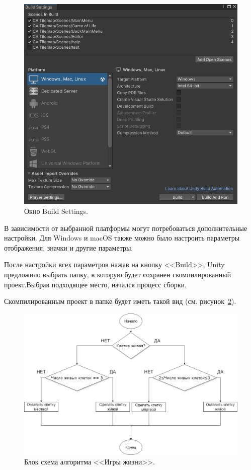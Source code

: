 \begin{figure}[H]
	\centering
	\includegraphics[width=1\textwidth]{images/build2.png}  
	\caption{Окно Build Settings.}
	\label{fig5}
\end{figure}

В зависимости от выбранной платформы могут потребоваться дополнительные настройки. Для Windows и macOS также можно было настроить параметры отображения, значки и другие параметры.

После настройки всех параметров нажав на кнопку <<Build>>, Unity предложило выбрать папку, в которую будет сохранен скомпилированный проект.Выбрав подходящее место, начался процесс сборки.

Скомпилированным проект в папке будет иметь такой вид (см. рисунок~\ref{fig5}). 
\begin{figure}[H]
	\centering
	\includegraphics[width=1\textwidth]{images/БлокСхема.png}  
	\caption{Блок схема алгоритма <<Игры жизни>>.}
	\label{fig5}
\end{figure}

